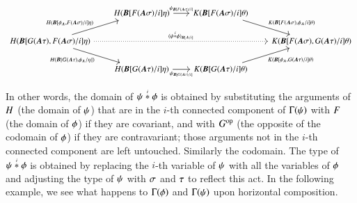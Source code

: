 \begin{definition}
    \[
    \begin{tikzcd}[column sep=2em]
    & \H(\subst \bfB {F(\bfA\sigma)} i \eta) \ar[r,"\psi_{\subst \bfB {\F(\bfA\sigma)} i}"] & \K(\subst \bfB {\F(\bfA\sigma)} i \theta) \ar[dr,"\K(\substMV \bfB {\F(\bfA\sigma)} {\phi_\bfA} i \theta)"] \\
    \H(\substMV \bfB {\G(\bfA\tau)} {\F(\bfA\sigma)} i \eta) \ar[ur,"\H(\substMV \bfB {\phi_\bfA} {\F(\bfA\sigma)} i \eta)"] \ar[dr,"\H(\substMV \bfB {\G(\bfA\tau)} {\phi_\bfA} \eta)"'] \ar[rrr,dotted,"(\HC \fst \snd i)_{\subst B \bfA i}"] & & & \K(\substMV \bfB {\F(\bfA\sigma)} {\G(\bfA\tau)} i \theta) \\
    & \H(\subst \bfB {\G(\bfA\tau)} i \eta) \ar[r,"\psi_{\subst \bfB {\G(\bfA\tau)} i}"'] & \K(\subst \bfB {G(\bfA\tau)} i \theta) \ar[ur,"\K(\substMV \bfB {\phi_\bfA} {\G(\bfA\tau)} i \theta)"']
    \end{tikzcd}
    \]
\end{definition}

In other words, the domain of $\HC \fst \snd i$ is obtained by substituting the arguments of $H$ (the domain of $\psi$) that are in the $i$-th connected component of $\Gamma\!\left(\psi\right)$ with $F$ (the domain of $\fst$) if they are covariant, and with $G^{\text{op}}$ (the opposite of the codomain of $\fst$) if they are contravariant; those arguments not in the $i$-th connected component are left untouched. Similarly the codomain. The type of $\HC \fst \snd i$ is obtained by replacing the $i$-th variable of $\psi$ with all the variables of $\fst$ and adjusting the type of $\psi$ with $\sigma$ and $\tau$ to reflect this act. In the following example, we see what happens to $\graph\fst$ and $\Gamma\!\left(\psi\right)$ upon horizontal composition.

